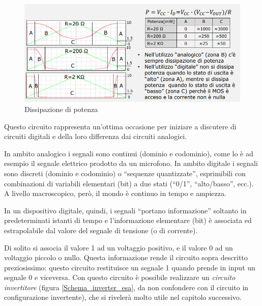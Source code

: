 \documentclass{article}
\begin{document}
\begin{figure}[h!]
  \centering
  \includegraphics[scale=0.58]{IM_inverter_penta}
  \caption{Dissipazione di potenza}
  \label{Schema_inverter_penta}
\end{figure}

\clearpage

Questo circuito rappresenta un'ottima occasione per iniziare a discutere di circuiti digitali e della loro differenza dai circuiti analogici. 

\vspace{3mm}

In ambito analogico i segnali sono continui (dominio e codominio), come lo è ad esempio il segnale elettrico prodotto da un microfono. In ambito digitale i segnali sono discreti (dominio e codominio) o ``sequenze quantizzate'', esprimibili con combinazioni di variabili elementari (bit) a due stati (``0/1'', ``alto/basso'', ecc.). A livello macroscopico, però, il mondo è continuo in tempo e ampiezza. 

\vspace{3mm}

In un dispositivo digitale, quindi, i segnali ``portano informazione'' soltanto in predeterminati istanti di tempo e l’informazione elementare (bit) è associata ed estrapolabile dal valore del segnale di tensione (o di corrente).

\vspace{3mm}

Di solito si associa il valore 1 ad un voltaggio positivo, e il valore 0 ad un voltaggio piccolo o nullo. Questa informazione rende il circuito sopra descritto preziosissimo: questo circuito restituisce un segnale 1 quando prende in input un segnale 0 e viceversa. Con questo circuito è possibile realizzare un \textit{circuito invertitore} (figura \ref{Schema_inverter_esa}, da non confondere con il circuito in configurazione invertente), che si rivelerà molto utile nel capitolo successivo.
\end{document}

